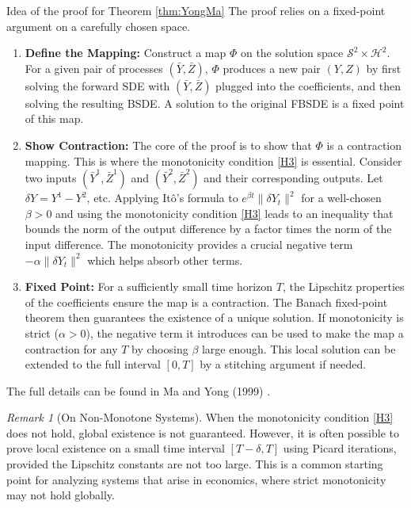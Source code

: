 \documentclass[11pt,letterpaper,oneside]{article}
\theoremstyle{plain}
\theoremstyle{definition}
\theoremstyle{remark}
\newtheorem{remark}{Remark}[section]
\begin{document}
\begin{leanproofbox}{Idea of the proof for Theorem \ref{thm:YongMa}}
The proof relies on a fixed-point argument on a carefully chosen space.
\begin{enumerate}
    \item \textbf{Define the Mapping:} Construct a map \(\Phi\) on the solution space \(\mathcal{S}^2 \times \mathcal{H}^2\). For a given pair of processes \((\bar{Y}, \bar{Z})\), \(\Phi\) produces a new pair \((Y,Z)\) by first solving the forward SDE with \((\bar{Y}, \bar{Z})\) plugged into the coefficients, and then solving the resulting BSDE. A solution to the original FBSDE is a fixed point of this map.
    \item \textbf{Show Contraction:} The core of the proof is to show that \(\Phi\) is a contraction mapping. This is where the monotonicity condition \ref{H3} is essential. Consider two inputs \((\bar{Y}^1, \bar{Z}^1)\) and \((\bar{Y}^2, \bar{Z}^2)\) and their corresponding outputs. Let \(\delta Y = Y^1 - Y^2\), etc. Applying Itô's formula to \(e^{\beta t}\|\delta Y_t\|^2\) for a well-chosen \(\beta > 0\) and using the monotonicity condition \ref{H3} leads to an inequality that bounds the norm of the output difference by a factor times the norm of the input difference. The monotonicity provides a crucial negative term \(-\alpha \|\delta Y_t\|^2\) which helps absorb other terms.
    \item \textbf{Fixed Point:} For a sufficiently small time horizon \(T\), the Lipschitz properties of the coefficients ensure the map is a contraction. The Banach fixed-point theorem then guarantees the existence of a unique solution. If monotonicity is strict (\(\alpha > 0\)), the negative term it introduces can be used to make the map a contraction for any \(T\) by choosing \(\beta\) large enough. This local solution can be extended to the full interval \([0,T]\) by a stitching argument if needed.
\end{enumerate}
The full details can be found in Ma and Yong (1999) \cite{MaYong1999}.
\end{leanproofbox}

\begin{remark}[On Non-Monotone Systems]
When the monotonicity condition \ref{H3} does not hold, global existence is not guaranteed. However, it is often possible to prove local existence on a small time interval \([T-\delta, T]\) using Picard iterations, provided the Lipschitz constants are not too large. This is a common starting point for analyzing systems that arise in economics, where strict monotonicity may not hold globally.
\end{remark}
\end{document}

